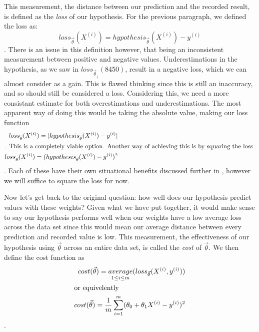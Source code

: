 This measurement, the distance between our prediction and the recorded result, is defined as the \emph{loss} of our hypothesis. For the previous paragraph, we defined the loss as:
\begin{equation*}
	loss_{\vec\theta}(X^{(i)}) = hypothesis_{\vec\theta}(X^{(i)})-y^{(i)}
\end{equation*}
. There is an issue in this definition however, that being an inconsistent measurement between positive and negative values. Underestimations in the hypothesis, as we saw in $loss_{\vec\theta_{\downarrow}}(8450)$, result in a negative loss, which we can almost consider as a gain. This is flawed thinking since this is still an inaccuracy, and so should still be considered a loss. Considering this, we need a more consistant estimate for both overestimations and underestimations. The most apparent way of doing this would be taking the absolute value, making our loss function
\begin{subequations}
\begin{align}
	loss_{\vec\theta}(X^{(i)}) = |hypothesis_{\vec\theta}(X^{(i)}) - y^{(i)}| \\
	\intertext{. This is a completely viable option. Another way of achieving this is by squaring the loss }
	loss_{\vec\theta}(X^{(i)}) = (hypothesis_{\vec\theta}(X^{(i)}) - y^{(i)})^2
\end{align}
\end{subequations}
. Each of these have their own situational benefits discussed further in \placeholder, however we will suffice to square the loss for now.

Now let's get back to the original question: how well does our hypothesis predict values with these weights? Given what we have put together, it would make sense to say our hypothesis performs well when our weights have a low average loss across the data set since this would mean our average distance between every prediction and recorded value is low. This measurement, the effectiveness of our hypothesis using $\vec\theta$ across an entire data set, is called the \emph{cost} of $\vec\theta$. We then define the cost function as
\begin{subequations}
    \begin{align}
        cost(\vec\theta) =\underset {1\leq i\leq m}{average}(loss_{\vec\theta}(X^{(i)}, y^{(i)})) \\
    \intertext{or equivelently}
        cost(\vec\theta) = \frac{1}{m}\sum_{i=1}^m (\theta_0 + \theta_1X^{(i)} -
        y^{(i)})^2
    \end{align}
\end{subequations}
.

